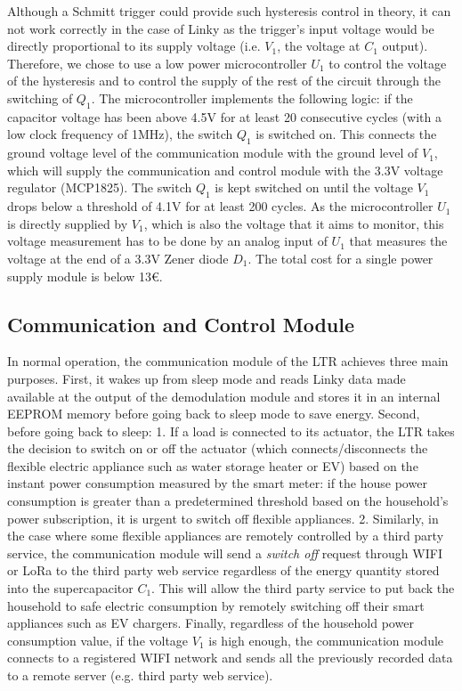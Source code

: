 \documentclass[conference]{IEEEtran}
\begin{document}
Although a Schmitt trigger could provide such hysteresis control in theory, it can not work correctly in the case of Linky as the trigger's input voltage would be directly proportional to its supply voltage (i.e.  $V_1$, the voltage at $C_1$ output).
 Therefore, we chose to use a low power microcontroller $U_1$  to control the voltage of the hysteresis and to control the supply of the rest of the circuit through the switching of  $Q_1$.  The microcontroller implements the following logic: if the capacitor voltage has been above 4.5V for at least  20 consecutive cycles (with a low clock frequency of 1MHz), the switch $Q_1$ is switched on. This connects the ground voltage level of the communication module with the ground level of  $V_1$, which will supply the communication and control module with the 3.3V voltage regulator (MCP1825). The switch  $Q_1$ is kept switched on  until the voltage $V_1$ drops below a threshold of 4.1V for at least 200 cycles. As the microcontroller  $U_1$ is directly supplied by $V_1$, which is also the voltage that it aims to monitor,
 this voltage measurement has to be done by an analog input of $U_1$ that measures the voltage at the end of a 3.3V Zener diode $D_1$.
 The total cost for a single  power supply module is below 13€. 

\subsection{Communication and Control Module}
\label{section:commodule}
In normal operation, the communication module of the LTR achieves three main purposes. First, it wakes up from sleep mode and reads  Linky data made available at the output of the demodulation module and stores it in an internal EEPROM memory before going back to sleep mode to save energy. Second, before going back to sleep: 1. If a load is connected to its actuator, the LTR takes the decision to switch on or off the actuator (which connects/disconnects the flexible electric appliance such as water storage heater or EV) based on the instant power consumption  measured by the smart meter: if the house power consumption is greater than a predetermined threshold based on the household's power subscription, it is urgent to switch off flexible appliances. 2. Similarly, in the case where some flexible appliances are remotely controlled by a third party service, 
 the communication module will send a \textit{switch off} request through WIFI or LoRa to the third party web service regardless of the energy quantity stored into the supercapacitor $C_1$. This will allow the third party service to put back the household to safe electric consumption by remotely switching  off their smart appliances  such as EV chargers. Finally, regardless of the household power consumption value, if the voltage $V_1$ is high enough, the communication module connects to a registered WIFI network and sends 	all the previously recorded data to a remote server (e.g. third party web service).  
\end{document}
